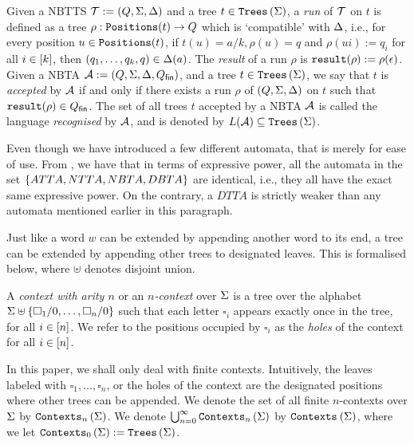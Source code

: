 \begin{definition}\label{def:acceptanceByNbta}
    Given a NBTTS $\mathcal{T} := (Q, \Sigma, \Delta)$ and a tree $t \in \texttt{Trees}\left(\Sigma\right)$, a \emph{run} of $\mathcal{T}$ on $t$ is defined as a tree $\rho : \texttt{Positions}(t) \to Q$ which is `compatible' with $\Delta$, i.e., for every position $u \in \texttt{Positions}(t)$, if $t(u) = a/k, \rho(u) = q$ and $\rho(ui) := q_i$ for all $i \in \left[ k \right]$, then $(q_1, \dots, q_k, q) \in \Delta(a)$. The \emph{result} of a run $\rho$ is $\texttt{result}(\rho) := \rho(\epsilon)$. Given a NBTA $\mathcal{A} := (Q, \Sigma, \Delta, Q_\textsf{fin})$, and a tree $t \in \texttt{Trees}\left(\Sigma\right)$, we say that $t$ is \emph{accepted} by $\mathcal{A}$ if and only if there exists a run $\rho$ of $(Q, \Sigma, \Delta)$ on $t$ such that $\texttt{result}(\rho) \in Q_\textsf{fin}$. The set of all trees $t$ accepted by a NBTA $\mathcal{A}$ is called the language \emph{recognised} by $\mathcal{A}$, and is denoted by $L(\mathcal{A}) \subseteq \texttt{Trees}\left(\Sigma\right)$.
\end{definition}

Even though we have introduced a few different automata, that is merely for ease of use. From \cite{tata}, we have that in terms of expressive power, all the automata in the set $\left\{ ATTA, NTTA, NBTA, DBTA \right\}$ are identical, i.e., they all have the exact same expressive power. On the contrary, a $DTTA$ is strictly weaker than any automata mentioned earlier in this paragraph.

Just like a word $w$ can be extended by appending another word to its end, a tree can be extended by appending other trees to designated leaves. This is formalised below, where $ \uplus$ denotes disjoint union.

\begin{definition}[Context]\label{def:context}
    A \emph{context with arity $n$} or an \emph{$n$-context} over $\Sigma$ is a tree over the alphabet $\Sigma \uplus \{\square_1/0, \dots, \square_n/0\}$ such that each letter $\square_i$ appears exactly once in the tree, for all $i \in \left[ n \right]$. We refer to the positions occupied by $\square_i$ as the \emph{holes} of the context for all $i \in \left[ n \right]$.
\end{definition}

In this paper, we shall only deal with finite contexts. Intuitively, the leaves labeled with $\square_1, \dots, \square_n$, or the holes of the context are the designated positions where other trees can be appended. We denote the set of all finite $n$-contexts over $\Sigma$ by $\texttt{Contexts}_{n}\left(\Sigma\right)$. We denote $\bigcup_{n=0}^\infty \texttt{Contexts}_{n}\left(\Sigma\right)$ by $\texttt{Contexts}_{}\left(\Sigma\right)$, where we let $\texttt{Contexts}_{0}\left(\Sigma\right) := \texttt{Trees}\left(\Sigma\right)$.

